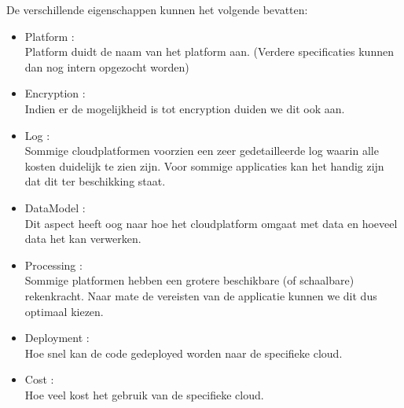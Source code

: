 \documentclass{article}
\begin{document}
De verschillende eigenschappen kunnen het volgende bevatten:
\begin{itemize}
    \item Platform : \\
    Platform duidt de naam van het platform aan. (Verdere specificaties kunnen dan nog intern opgezocht worden)
    \item Encryption : \\
    Indien er de mogelijkheid is tot encryption duiden we dit ook aan.
    \item Log : \\
    Sommige cloudplatformen voorzien een zeer gedetailleerde log waarin alle kosten duidelijk te zien zijn.  Voor sommige applicaties kan het handig zijn dat dit ter beschikking staat.
    \item DataModel : \\
    Dit aspect heeft oog naar hoe het cloudplatform omgaat met data en hoeveel data het kan verwerken.
    \item Processing : \\
    Sommige platformen hebben een grotere beschikbare (of schaalbare) rekenkracht.  Naar mate de vereisten van de applicatie kunnen we dit dus optimaal kiezen.
    \item Deployment : \\
    Hoe snel kan de code gedeployed worden naar de specifieke cloud.
    \item Cost : \\
    Hoe veel kost het gebruik van de specifieke cloud.
\end{itemize}
\end{document}
